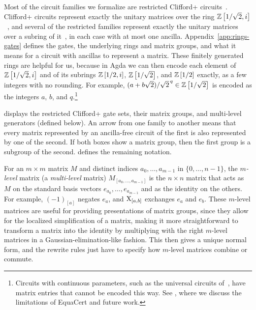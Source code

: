 \documentclass[acmsmall,screen,nonacm]{acmart}
\begin{document}
Most of the circuit families we formalize are restricted Clifford+\T{} circuits~\cite{amy2020numbertheoretic}. Clifford+\T{} circuits represent exactly the unitary matrices over the ring $\mathbb{Z}\left[1/\sqrt2,i\right]$~\cite{giles2013exact}, and several of the restricted families represent exactly the unitary matrices over a subring of it~\cite{amy2020numbertheoretic}, in each case with at most one ancilla. Appendix~\ref{app:rings-gates} defines the gates, the underlying rings and matrix groups, and what it means for a circuit with ancillas to represent a matrix. These finitely generated rings are helpful for us, because in Agda we can then encode each element of $\mathbb{Z}\left[1/\sqrt2,i\right]$ and of its subrings $\mathbb{Z}\left[1/2,i\right]$, $\mathbb{Z}\left[1/\sqrt2\right]$, and $\mathbb{Z}\left[1/2\right]$ exactly, as a few integers with no rounding. For example, $(a+b\sqrt2)/\sqrt2^{\,q}\in\mathbb{Z}\left[1/\sqrt2\right]$ is encoded as the integers $a$, $b$, and $q$.\footnote{Circuits with continuous parameters, such as the universal circuits of~\cite{clement2023complete}, have matrix entries that cannot be encoded this way. See , where we discuss the limitations of EquaCert and future work.}

 displays the restricted Clifford+\T{} gate sets, their matrix groups, and multi-level generators (defined below). An arrow from one family to another means that every matrix represented by an ancilla-free circuit of the first is also represented by one of the second. If both boxes show a matrix group, then the first group is a subgroup of the second.  defines the remaining notation.

For an $m\times m$ matrix $M$ and distinct indices $a_0,\dots,a_{m-1}$ in $\{0,\dots,n-1\}$, the \emph{$m$-level} matrix (a \emph{multi-level} matrix) $M_{[a_0,\dots,a_{m-1}]}$ is the $n\times n$ matrix that acts as $M$ on the standard basis vectors $e_{a_0},\dots,e_{a_{m-1}}$ and as the identity on the others. For example, $(-1)_{[a]}$ negates $e_a$, and $\mathrm{X}_{[a,b]}$ exchanges $e_a$ and $e_b$. 
These $m$-level matrices are useful for providing presentations of matrix groups, since they allow for the localized simplification of a matrix, making it more straightforward to transform a matrix into the identity by multiplying with the right $m$-level matrices in a Gaussian-elimination-like fashion. This then gives a unique normal form, and the rewrite rules just have to specify how $m$-level matrices combine or commute.
\end{document}
